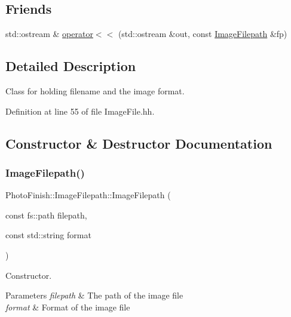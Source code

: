 \subsection*{Friends}
\begin{DoxyCompactItemize}
\item 
std\+::ostream \& \hyperlink{class_photo_finish_1_1_image_filepath_a1eee4f55a949c2f66f1200d87c0e0f7c}{operator$<$$<$} (std\+::ostream \&out, const \hyperlink{class_photo_finish_1_1_image_filepath}{Image\+Filepath} \&fp)
\end{DoxyCompactItemize}


\subsection{Detailed Description}
Class for holding filename and the image format. 

Definition at line 55 of file Image\+File.\+hh.



\subsection{Constructor \& Destructor Documentation}
\mbox{\label{class_photo_finish_1_1_image_filepath_aae5f02530cacc69824458e02b8eac08d}} 
\subsubsection{\texorpdfstring{Image\+Filepath()}{ImageFilepath()}\hspace{0.1cm}{\footnotesize\ttfamily [1/2]}}
{\footnotesize\ttfamily Photo\+Finish\+::\+Image\+Filepath\+::\+Image\+Filepath (\begin{DoxyParamCaption}\item[{const fs\+::path}]{filepath,  }\item[{const std\+::string}]{format }\end{DoxyParamCaption})}



Constructor. 


\begin{DoxyParams}{Parameters}
{\em filepath} & The path of the image file \\
\hline
{\em format} & Format of the image file \\
\hline
\end{DoxyParams}


